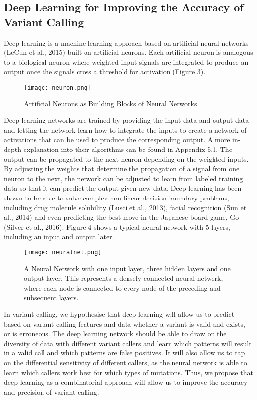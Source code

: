 \documentclass{article}
\begin{document}
\subsection{Deep Learning for Improving the Accuracy of Variant Calling} 
Deep learning is a machine learning approach based on artificial neural networks (LeCun et al., 2015) built on artificial neurons. Each artificial neuron is analogous to a biological neuron where weighted input signals are integrated to produce an output once the signals cross a threshold for activation (Figure 3).  
\begin{figure}[H]
\texttt{[image: neuron.png]}
\centering
\caption{Artificial Neurons as Building Blocks of Neural Networks}
\end{figure}
Deep learning networks are trained by providing the input data and output data and letting the network learn how to integrate the inputs to create a network of activations that can be used to produce the corresponding output. A more in-depth explanation into their algorithms can be found in Appendix 5.1. 
The output can be propagated to the next neuron depending on the weighted inputs.
By adjusting the weights that determine the propagation of a signal from one neuron to the next, the network can be adjusted to learn from labeled training data so that it can predict the output given new data.
Deep learning has been shown to be able to solve  complex non-linear decision boundary problems, including drug molecule solubility (Lusci et al., 2013), facial recognition (Sun et al., 2014) and even predicting the best move in the Japanese board game, Go (Silver et al., 2016). Figure 4 shows a typical neural network with 5 layers, including an input and output later.
\begin{figure}[H]
\texttt{[image: neuralnet.png]}
\centering
\caption{A Neural Network with one input layer, three hidden layers and one output layer. This represents a densely connected neural network, where each node is connected to every node of the preceding and subsequent layers.}
\end{figure}
In variant calling, we hypothesise that deep learning will allow us to predict based on variant calling features and data whether a variant is valid and exists, or is erroneous. The deep learning network should be able to draw on the diversity of data with different variant callers and learn which patterns will result in a valid call and which patterns are false positives. It will also allow us to tap on the differential sensitivity of different callers, as the neural network is able to learn which callers work best for which types of mutations. Thus, we propose that deep learning as a combinatorial approach will allow us to improve the accuracy and precision of variant calling.
\end{document}
